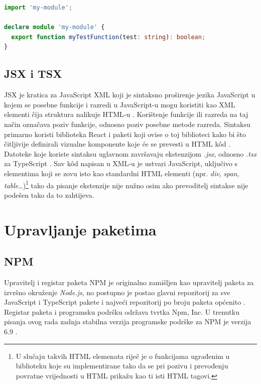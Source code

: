 \documentclass[times, utf8, diplomski, numeric]{fer}
\newcommand{\razmakp}{\vspace{18pt}}
\newcommand{\razmaks}{\vspace{10pt}}
\begin{document}
\razmakp %
\begin{lstlisting}[language=TypeScript, caption={Primjer deklaracijske datoteke}, label={lst:declaration_file}]
import 'my-module';

declare module 'my-module' {
  export function myTestFunction(test: string): boolean;
}
\end{lstlisting}
\razmaks


\subsection{JSX i TSX}

JSX je kratica za JavaScript XML koji je sintaksno proširenje jezika JavaScript u kojem se posebne funkcije i razredi u JavaScript-u mogu koristiti kao XML elementi čija struktura nalikuje HTML-u \citep{jsx_spec}.
Korištenje funkcije ili razreda na taj način označava poziv funkcije, odnosno poziv posebne metode razreda.
Sintaksu primarno koristi biblioteka React i paketi koji ovise o toj biblioteci kako bi što čitljivije definirali vizualne komponente koje će se prevesti u HTML kôd \citep{react_docs}.
Datoteke koje koriste sintaksu uglavnom završavaju ekstenzijom \emph{.jsx}, odnosno \emph{.tsx} za TypeScript \citep{ts_hand}.
Sav kôd napisan u XML-u je ustvari JavaScript, uključivo s elementima koji se zovu isto kao standardni HTML elementi (npr. \emph{div}, \emph{span}, \emph{table}…)\footnote{
    U slučaju takvih HTML elemenata riječ je o funkcijama ugrađenim u biblioteku koje su implementirane tako da se pri pozivu i prevođenju povratne vrijednosti u HTML prikažu kao ti isti HTML tagovi.
} tako da pisanje ekstenzije nije nužno osim ako prevoditelj sintakse nije podešen tako da to zahtijeva.


\newpage
\section{Upravljanje paketima}

\razmaks
\subsection{NPM}

Upravitelj i registar paketa NPM je originalno zamišljen kao upravitelj paketa za izvršno okruženje \emph{Node.js}, no postupno je postao glavni repozitorij za sve JavaScript i TypeScript pakete i najveći repozitorij po broju paketa općenito \citep{med_npm_stats}.
Registar paketa i programsku podršku održava tvrtka Npm, Inc.
U trenutku pisanja ovog rada zadnja stabilna verzija programske podrške za NPM je verzija 6.9 \citep{wiki_npm}.
\end{document}
